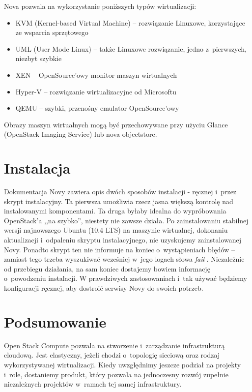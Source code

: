 Nova pozwala na wykorzystanie poniższych typów wirtualizacji\cite{nova_manual}:

\begin{itemize}
\item KVM (Kernel-based Virtual Machine) -- rozwiązanie Linuxowe, korzystające ze wsparcia sprzętowego
\item UML (User Mode Linux) -- także Linuxowe rozwiązanie, jedno z~pierwszych, niezbyt szybkie
\item XEN -- OpenSource'owy monitor maszyn wirtualnych
\item Hyper-V -- rozwiązanie wirtualizacyjne od Microsoftu
\item QEMU -- szybki, przenośny emulator OpenSource'owy
\end{itemize}

Obrazy maszyn wirtualnych mogą być przechowywane przy użyciu Glance (OpenStack Imaging Service) lub nova-objectstore.

\section{Instalacja}

Dokumentacja Novy zawiera opis dwóch sposobów instalacji - ręcznej i~przez skrypt instalacyjny\cite{nova_manual}. Ta pierwsza umożliwia rzecz jasna większą kontrolę nad instalowanymi komponentami. Ta druga byłaby idealna do wypróbowania OpenStack'a ,,na szybko'', niestety nie zawsze działa. Po zainstalowaniu stabilnej wersji najnowszego Ubuntu (10.4 LTS) na maszynie wirtualnej, dokonaniu aktualizacji i~odpaleniu skryptu instalacyjnego, nie uzyskujemy zainstalowanej Novy. Ponadto skrypt ten nie informuje na koniec o~wystąpieniach błędów -- zamiast tego trzeba wyszukiwać wcześniej w~jego logach słowa { \it fail }. Niezależnie od przebiegu działania, na sam koniec dostajemy bowiem informację o~powodzeniu instalacji.
W prawdziwych zastosowaniach i~tak używać będziemy konfiguracji ręcznej, aby dostroić serwisy Novy do swoich potrzeb.

\section{Podsumowanie}

Open Stack Compute pozwala na stworzenie i~zarządzanie infrastrukturą cloudową. Jest elastyczny, jeżeli chodzi o~topologię sieciową oraz rodzaj wykorzystywanej wirtualizacji. Kiedy uwzględnimy jeszcze podział na projekty i~role, dostaniemy produkt, który pozwala na jednoczesny rozwój zupełnie niezależnych projektów w~ramach tej samej infrastruktury.





